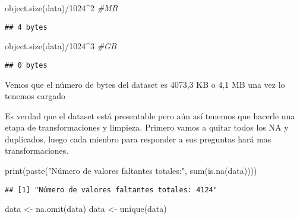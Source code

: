 \documentclass[
]{article}
\newenvironment{Shaded}{\begin{snugshade}}{\end{snugshade}}
\newcommand{\CommentTok}[1]{\textcolor[rgb]{0.56,0.35,0.01}{\textit{#1}}}
\newcommand{\DecValTok}[1]{\textcolor[rgb]{0.00,0.00,0.81}{#1}}
\newcommand{\FunctionTok}[1]{\textcolor[rgb]{0.00,0.00,0.00}{#1}}
\newcommand{\NormalTok}[1]{#1}
\newcommand{\OtherTok}[1]{\textcolor[rgb]{0.56,0.35,0.01}{#1}}
\newcommand{\SpecialCharTok}[1]{\textcolor[rgb]{0.00,0.00,0.00}{#1}}
\newcommand{\StringTok}[1]{\textcolor[rgb]{0.31,0.60,0.02}{#1}}
\begin{document}
\begin{Shaded}
\begin{Highlighting}[]
\FunctionTok{object.size}\NormalTok{(data)}\SpecialCharTok{/}\DecValTok{1024}\SpecialCharTok{\^{}}\DecValTok{2} \CommentTok{\#MB}
\end{Highlighting}
\end{Shaded}

\begin{verbatim}
## 4 bytes
\end{verbatim}

\begin{Shaded}
\begin{Highlighting}[]
\FunctionTok{object.size}\NormalTok{(data)}\SpecialCharTok{/}\DecValTok{1024}\SpecialCharTok{\^{}}\DecValTok{3} \CommentTok{\#GB}
\end{Highlighting}
\end{Shaded}

\begin{verbatim}
## 0 bytes
\end{verbatim}

Vemos que el número de bytes del dataset es 4073,3 KB o 4,1 MB una vez
lo tenemos cargado

Es verdad que el dataset está presentable pero aún así tenemos que
hacerle una etapa de transformaciones y limpieza. Primero vamos a quitar
todos los NA y duplicados, luego cada mienbro para responder a sus
preguntas hará mas transformaciones.

\begin{Shaded}
\begin{Highlighting}[]
\FunctionTok{print}\NormalTok{(}\FunctionTok{paste}\NormalTok{(}\StringTok{"Número de valores faltantes totales:"}\NormalTok{, }\FunctionTok{sum}\NormalTok{(}\FunctionTok{is.na}\NormalTok{(data))))}
\end{Highlighting}
\end{Shaded}

\begin{verbatim}
## [1] "Número de valores faltantes totales: 4124"
\end{verbatim}

\begin{Shaded}
\begin{Highlighting}[]
\NormalTok{data }\OtherTok{\textless{}{-}} \FunctionTok{na.omit}\NormalTok{(data)}
\NormalTok{data }\OtherTok{\textless{}{-}} \FunctionTok{unique}\NormalTok{(data)}
\end{Highlighting}
\end{Shaded}
\end{document}
